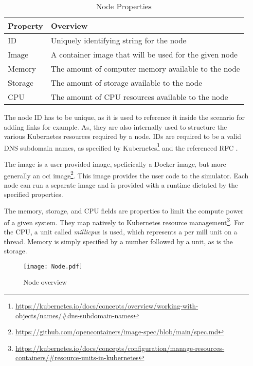 \begin{table}[H]
  \centering
  \begin{tabular}{ l|l }
    \label{table:properties-node}
    Property & Overview                                               \\
    \hline
    ID       & Uniquely identifying string for the node               \\
    Image    & A container image that will be used for the given node \\
    Memory   & The amount of computer memory available to the node    \\
    Storage  & The amount of storage available to the node            \\
    CPU      & The amount of CPU resources available to the node      \\
  \end{tabular}
  \caption{Node Properties}
\end{table}


The node ID has to be unique, as it is used to reference it inside the scenario for adding links for example. As, they are also internally used to structure the various Kubernetes resources required by a node. IDs are required to be a valid DNS subdomain names, as specified by Kubernetes\footnote{\url{https://kubernetes.io/docs/concepts/overview/working-with-objects/names/\#dns-subdomain-names}} and the referenced RFC \cite{RFC1123}.

The image is a user provided image, speficically a Docker image, but more generally an \ac{oci} image\footnote{\url{https://github.com/opencontainers/image-spec/blob/main/spec.md}}. This image provides the user code to the simulator. Each node can run a separate image and is provided with a runtime dictated by the specified properties.

The memory, storage, and CPU fields are properties to limit the compute power of a given system. They map natively to Kubernetes resource management\footnote{\url{https://kubernetes.io/docs/concepts/configuration/manage-resources-containers/\#resource-units-in-kubernetes}}. For the CPU, a unit called \textit{millicpu}s is used, which represents a per mill unit on a thread. Memory is simply specified by a number followed by a unit, as is the storage.

\begin{figure}[H]
  \label{fig:nodes-overview}
  \caption{Node overview}
  \centering
  \texttt{[image: Node.pdf]}
\end{figure}

